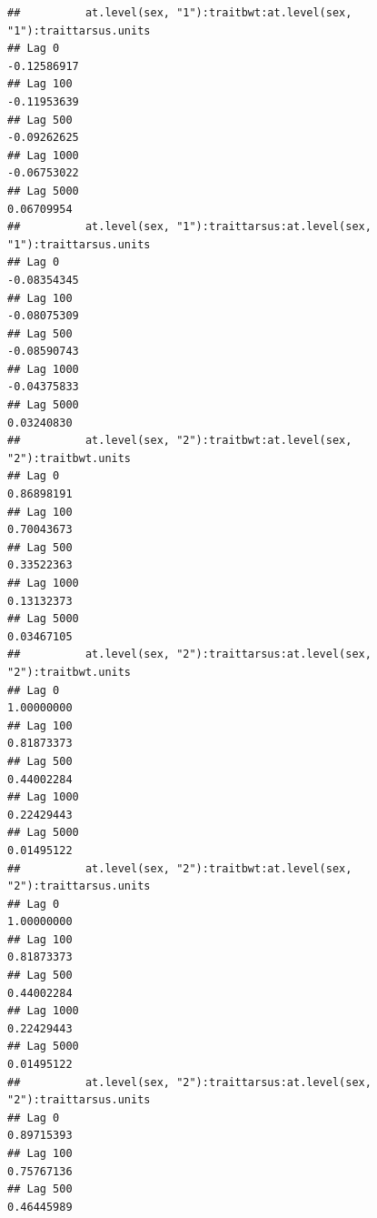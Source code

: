 \documentclass[
  12pt,
]{book}
\begin{document}
\begin{verbatim}
##          at.level(sex, "1"):traitbwt:at.level(sex, "1"):traittarsus.units
## Lag 0                                                         -0.12586917
## Lag 100                                                       -0.11953639
## Lag 500                                                       -0.09262625
## Lag 1000                                                      -0.06753022
## Lag 5000                                                       0.06709954
##          at.level(sex, "1"):traittarsus:at.level(sex, "1"):traittarsus.units
## Lag 0                                                            -0.08354345
## Lag 100                                                          -0.08075309
## Lag 500                                                          -0.08590743
## Lag 1000                                                         -0.04375833
## Lag 5000                                                          0.03240830
##          at.level(sex, "2"):traitbwt:at.level(sex, "2"):traitbwt.units
## Lag 0                                                       0.86898191
## Lag 100                                                     0.70043673
## Lag 500                                                     0.33522363
## Lag 1000                                                    0.13132373
## Lag 5000                                                    0.03467105
##          at.level(sex, "2"):traittarsus:at.level(sex, "2"):traitbwt.units
## Lag 0                                                          1.00000000
## Lag 100                                                        0.81873373
## Lag 500                                                        0.44002284
## Lag 1000                                                       0.22429443
## Lag 5000                                                       0.01495122
##          at.level(sex, "2"):traitbwt:at.level(sex, "2"):traittarsus.units
## Lag 0                                                          1.00000000
## Lag 100                                                        0.81873373
## Lag 500                                                        0.44002284
## Lag 1000                                                       0.22429443
## Lag 5000                                                       0.01495122
##          at.level(sex, "2"):traittarsus:at.level(sex, "2"):traittarsus.units
## Lag 0                                                             0.89715393
## Lag 100                                                           0.75767136
## Lag 500                                                           0.46445989

\end{verbatim}
\end{document}
